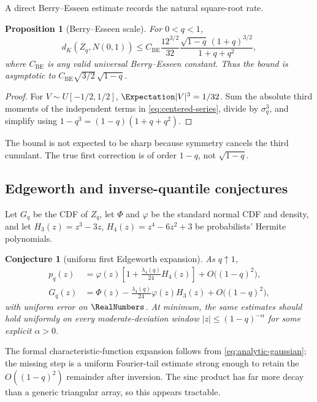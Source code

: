 \documentclass[11pt]{article}
\newtheorem{proposition}[theorem]{Proposition}
\newtheorem{conjecture}[theorem]{Conjecture}
\theoremstyle{definition}
\theoremstyle{remark}
\newcommand{\PhiN}{\Phi}
\newcommand{\phiN}{\varphi}
\begin{document}
A direct Berry--Esseen estimate records the natural square-root rate.

\begin{proposition}[Berry--Esseen scale]\label{prop:berry-esseen}
For $0<q<1$,
\begin{equation}\label{eq:berry-esseen}
 d_K(Z_q,N(0,1))
 \le C_{\mathrm{BE}}\frac{12^{3/2}}{32}
 \frac{\sqrt{1-q}\,(1+q)^{3/2}}{1+q+q^2},
\end{equation}
where $C_{\mathrm{BE}}$ is any valid universal Berry--Esseen constant.  Thus the bound is asymptotic to
$C_{\mathrm{BE}}\sqrt{3/2}\,\sqrt{1-q}$.
\end{proposition}

\begin{proof}
For $V\sim U[-1/2,1/2]$, $\Expectation|V|^3=1/32$.  Sum the absolute third moments of the independent terms in \cref{eq:centered-series}, divide by $\sigma_q^3$, and simplify using $1-q^3=(1-q)(1+q+q^2)$.
\end{proof}

The bound is not expected to be sharp because symmetry cancels the third cumulant.  The true first correction is of order $1-q$, not $\sqrt{1-q}$.

\subsection{Edgeworth and inverse-quantile conjectures}

Let $G_q$ be the CDF of $Z_q$, let $\PhiN$ and $\phiN$ be the standard normal CDF and density, and let $H_3(z)=z^3-3z$, $H_4(z)=z^4-6z^2+3$ be probabilists' Hermite polynomials.

\begin{conjecture}[uniform first Edgeworth expansion]\label{conj:edgeworth}
As $q\uparrow1$,
\begin{align}
 p_q(z)&=\phiN(z)\left[1+\frac{\lambda_4(q)}{24}H_4(z)\right]
 +O\bigl((1-q)^2\bigr),\label{eq:edge-density}\\
 G_q(z)&=\PhiN(z)-\frac{\lambda_4(q)}{24}\phiN(z)H_3(z)
 +O\bigl((1-q)^2\bigr),\label{eq:edge-cdf}
\end{align}
with uniform error on $\RealNumbers$.  At minimum, the same estimates should hold uniformly on every moderate-deviation window $|z|\le (1-q)^{-\alpha}$ for some explicit $\alpha>0$.
\end{conjecture}

The formal characteristic-function expansion follows from \cref{eq:analytic-gaussian}; the missing step is a uniform Fourier-tail estimate strong enough to retain the $O((1-q)^2)$ remainder after inversion.  The sinc product has far more decay than a generic triangular array, so this appears tractable.
\end{document}
